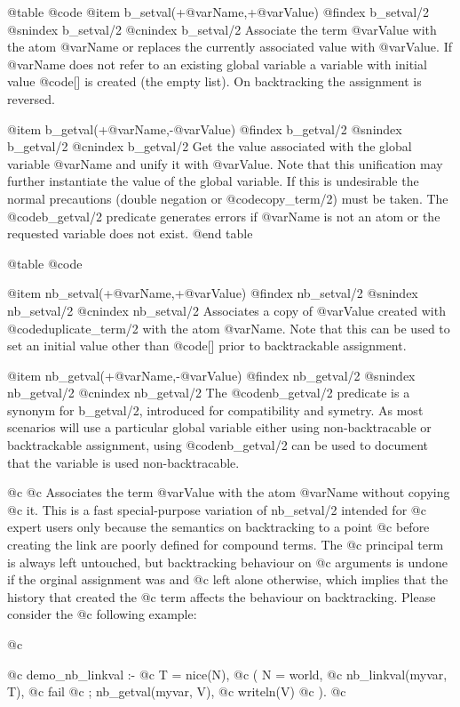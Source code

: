 @table @code
@item b_setval(+@var{Name},+@var{Value})
@findex b_setval/2
@snindex b_setval/2
@cnindex b_setval/2
Associate the term @var{Value} with the atom @var{Name} or replaces
the currently associated value with @var{Value}.  If @var{Name} does
not refer to an existing global variable a variable with initial value
@code{[]} is created (the empty list).  On backtracking the
assignment is reversed.

@item b_getval(+@var{Name},-@var{Value})
@findex b_getval/2
@snindex b_getval/2
@cnindex b_getval/2
Get the value associated with the global variable @var{Name} and unify
it with @var{Value}. Note that this unification may further instantiate
the value of the global variable. If this is undesirable the normal
precautions (double negation or @code{copy_term/2}) must be taken. The
@code{b_getval/2} predicate generates errors if @var{Name} is not an atom or
the requested variable does not exist.
@end table

@table @code

@item nb_setval(+@var{Name},+@var{Value})
@findex nb_setval/2
@snindex nb_setval/2
@cnindex nb_setval/2
Associates a copy of @var{Value} created with @code{duplicate_term/2}
with the atom @var{Name}.  Note that this can be used to set an
initial value other than @code{[]} prior to backtrackable assignment.

@item nb_getval(+@var{Name},-@var{Value})
@findex nb_getval/2
@snindex nb_getval/2
@cnindex nb_getval/2
The @code{nb_getval/2} predicate is a synonym for b_getval/2, introduced for
compatibility and symetry.  As most scenarios will use a particular
global variable either using non-backtracable or backtrackable
assignment, using @code{nb_getval/2} can be used to document that the 
variable is used non-backtracable.

@c     
@c Associates the term @var{Value} with the atom @var{Name} without copying
@c it. This is a fast special-purpose variation of nb_setval/2 intended for
@c expert users only because the semantics on backtracking to a point
@c before creating the link are poorly defined for compound terms. The
@c principal term is always left untouched, but backtracking behaviour on
@c arguments is undone if the orginal assignment was  and
@c left alone otherwise, which implies that the history that created the
@c term affects the behaviour on backtracking. Please consider the
@c following example:

@c \begin{code}
@c demo_nb_linkval :-
@c 	T = nice(N),
@c 	(   N = world,
@c 	    nb_linkval(myvar, T),
@c 	    fail
@c 	;   nb_getval(myvar, V),
@c 	    writeln(V)
@c 	).
@c \end{code}

